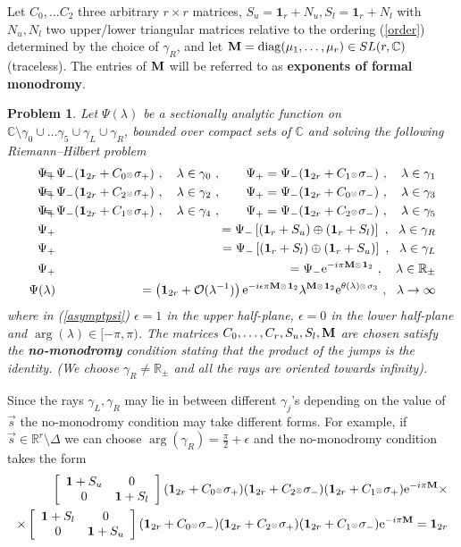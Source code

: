 \documentclass{article}
\newtheorem{problem}{Problem}[section]
\def\ot{\hbox{\resizebox{6pt}{!}{$ \otimes \,
$}}}
\def \C{{\mathbf C}}
\def\s{\sigma}
\def\C{{\mathbb C}}
\def\&{&\hspace{-20pt}}
\def\R{{\mathbb R}}
\def\1{\mathbf 1}
\newcommand{\be}{\begin{eqnarray}}
\newcommand{\ee}{\end{eqnarray}}
\def\le{\left}
\def\ri{\right}
\begin{document}
% 
%  
Let $C_0,\dots C_2$  three arbitrary $r\times r$ matrices,  $S_u=\1_r+N_u, S_l=\1_r+N_l$ with $N_u,N_l$ two upper/lower triangular matrices relative to the ordering (\ref{order}) 
 determined by the choice of $\gamma_R$, and let ${\bf M} = {\rm diag}(\mu_1,\dots, \mu_r) \in SL(r,\C)$ (traceless). The entries of ${\bf M}$ will be referred to as {\bf exponents of formal monodromy}.
\begin{problem} 
\label{PsincP2}
Let $\Psi(\lambda)$ be a sectionally analytic function on $\C\setminus \gamma_0\cup\dots\gamma_5\cup \gamma_L\cup \gamma_R$, bounded over compact sets of $\C$ and solving the following Riemann--Hilbert problem 
\be
\Psi_+ &\& = \Psi_-(\1_{2r} + C_{0}\ot \s_+)\ ,\ \ \ \lambda \in \gamma_0\ ,\qquad
\Psi_+ = \Psi_-(\1_{2r} + C_{1}\ot \s_-)\ ,\ \ \ \lambda \in \gamma_1\\
\Psi_+ &\&= \Psi_-(\1_{2r} + C_{2}\ot \s_+)\ ,\ \ \ \lambda \in \gamma_2\  ,\qquad
\Psi_+ = \Psi_-(\1_{2r} + C_{0}\ot \s_-)\ ,\ \ \ \lambda \in \gamma_3\\
\Psi_+ &\&= \Psi_-(\1_{2r} + C_{1}\ot \s_+)\ ,\ \ \ \lambda \in \gamma_4\ ,\qquad
\Psi_+ = \Psi_-(\1_{2r} + C_{2}\ot \s_-)\ ,\ \ \ \lambda \in \gamma_5 \\
\Psi_+&\& = \Psi_-\le[(\1_r + S_u)\oplus (\1_r+S_l)\ri]\ ,\ \ \lambda \in \gamma_R\\
\Psi_+&\& = \Psi_-\le[(\1_r + S_l)\oplus (\1_r+S_u)\ri]\ ,\ \ \lambda \in \gamma_L\\
\Psi_+&\& = \Psi_-{\rm e}^{ - i\pi {\bf M}\ot\1_2}\ ,\ \ \ \lambda \in \R_\pm\\
\Psi(\lambda) &\& =  \le(\1_{2r} + \mathcal O(\lambda^{-1})\ri)
{\rm e}^{-i\epsilon \pi {\bf M}\ot \1_2}
\lambda^{ {\bf M}\ot \1_2} {\rm e}^{\theta(\lambda)\ot \s_3}\ ,\ \  \lambda\to\infty \label{asymptpsi}
\ee
where in (\ref{asymptpsi})  $\epsilon=1$ in the upper half-plane, $\epsilon=0$ in the lower half-plane and $\arg(\lambda)\in [-\pi,\pi)$.
The matrices  $C_0,\dots, C_r, S_u, S_l, {\bf M}$ are chosen satisfy the {\bf no-monodromy} condition stating that the product of the jumps  is the identity. (We choose $\gamma_R\neq \R_\pm$ and all the rays are oriented towards infinity).
\end{problem}
Since the rays $\gamma_L,\gamma_R$ may lie in between different $\gamma_j$'s depending on the value of $\vec s$ the no-monodromy condition may take different forms. For example, if $\vec s\in \R^r\setminus \Delta$ we can choose $\arg (\gamma_R)=\frac \pi 2+\epsilon$ and the no-monodromy condition takes the form  
\be
\le[
\begin{array}{cc}
\1 + S_u & 0 \\
0 & \1 + S_l
\end{array}
\ri](\1_{2r} + C_0\ot \s_+)(\1_{2r} + C_2\ot \s_-)(\1_{2r} + C_1\ot \s_+){\rm e}^{-i\pi {\bf M}}\times\nonumber \\
\times
\le[
\begin{array}{cc}
\1 + S_l & 0 \\
0 & \1 + S_u
\end{array}
\ri](\1_{2r} + C_0\ot \s_-)(\1_{2r} + C_2\ot \s_+)(\1_{2r} + C_1\ot \s_-){\rm e}^{-i\pi {\bf M}}=\1_{2r}
\label{nomonodromy}
\ee
\end{document}
